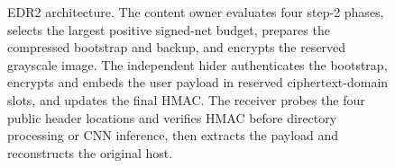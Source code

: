 \begin{figure}[t]
{%
}
\caption{EDR2 architecture. The content owner evaluates four step-2 phases, selects the largest positive signed-net budget, prepares the compressed bootstrap and backup, and encrypts the reserved grayscale image. The independent hider authenticates the bootstrap, encrypts and embeds the user payload in reserved ciphertext-domain slots, and updates the final HMAC. The receiver probes the four public header locations and verifies HMAC before directory processing or CNN inference, then extracts the payload and reconstructs the original host.}
\label{fig:system-overview}
\end{figure}
